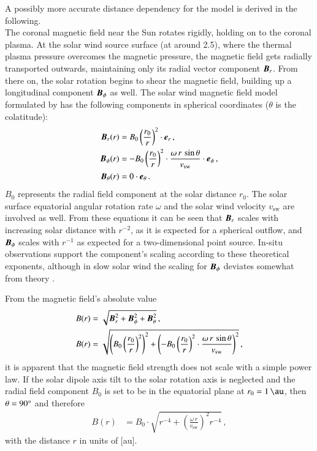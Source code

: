 A possibly more accurate distance dependency for the model is derived in the following.\\

The coronal magnetic field near the Sun rotates rigidly, holding on to the coronal plasma. At the solar wind source surface (at around \SI{2.5}{\Rs}), where the thermal plasma pressure overcomes the magnetic pressure, the magnetic field gets radially transported outwards, maintaining only its radial vector component $\boldsymbol{B}_r$. From there on, the solar rotation begins to shear the magnetic field, building up a longitudinal component $\boldsymbol{B}_\phi$ as well. The solar wind magnetic field model formulated by \citet{Parker1958} has the following components in spherical coordinates ($\theta$ is the colatitude):
\begin{align}
	\boldsymbol{B}_r(r) &= B_0 \left(\frac{r_0}{r}\right)^2 \cdot \boldsymbol{e}_r\,,\\
	\boldsymbol{B}_\phi(r) &= -B_0 \left(\frac{r_0}{r}\right)^2 \cdot \frac{\omega\,r\,\sin\theta}{v_\text{sw}} \cdot \boldsymbol{e}_\phi	\,,	\label{eq:b_phi_vector}\\
	\boldsymbol{B}_\theta(r) &= 0 \cdot \boldsymbol{e}_\theta\,.
\end{align}
$B_0$ represents the radial field component at the solar distance $r_0$. The solar surface equatorial angular rotation rate $\omega$ and the solar wind velocity $v_\text{sw}$ are involved as well. From these equations it can be seen that $\boldsymbol{B}_r$ scales with increasing solar distance with $r^{-2}$, as it is expected for a spherical outflow, and $\boldsymbol{B}_\phi$ scales with $r^{-1}$ as expected for a two-dimensional point source. In-situ observations support the component's scaling according to these theoretical exponents, although in slow solar wind the scaling for $\boldsymbol{B}_\phi$ deviates somewhat from theory \citep{Mariani1978}.

From the magnetic field's absolute value
\begin{align}
	B(r) &= \sqrt{\boldsymbol{B}_r^2 + \boldsymbol{B}_\phi^2 + \boldsymbol{B}_\theta^2}\,,	\label{eq:B_absolute}\\
	B(r) &= \sqrt{\left(B_0 \left(\frac{r_0}{r}\right)^2\right)^2 + \left(-B_0 \left(\frac{r_0}{r}\right)^2 \cdot \frac{\omega\,r\,\sin\theta}{v_\text{sw}}\right)^2}\,,
\end{align}
it is apparent that the magnetic field strength does not scale with a simple power law. If the solar dipole axis tilt to the solar rotation axis is neglected and the radial field component $B_0$ is set to be in the equatorial plane at $r_0 = \SI{1}{\au}$, then $\theta = 90\degree$ and therefore
\begin{align}
	B(r) &= B_0 \cdot \sqrt{r^{-4} + \left(\frac{\omega\,r}{v_\text{sw}}\right)^2 r^{-4}}\,,	\label{eq:B_1au}
\end{align}
with the distance $r$ in units of [au].

